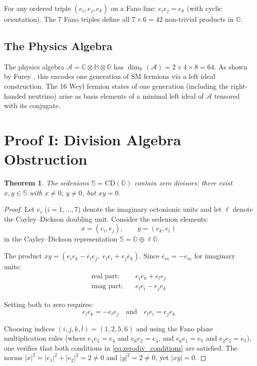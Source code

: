 \documentclass[12pt,a4paper]{article}
\newtheorem{theorem}{Theorem}
\theoremstyle{definition}
\theoremstyle{remark}
\newcommand{\Oct}{\mathbb{O}}
\newcommand{\Quat}{\mathbb{H}}
\newcommand{\Comp}{\mathbb{C}}
\newcommand{\Real}{\mathbb{R}}
\newcommand{\Sed}{\mathbb{S}}
\newcommand{\Alg}{\mathcal{A}}
\begin{document}
For any ordered triple $(e_i, e_j, e_k)$ on a Fano line: $e_i e_j = e_k$ 
(with cyclic orientation). The 7 Fano triples define all 
$7 \times 6 = 42$ non-trivial products in $\Oct$.

\subsection{The Physics Algebra}

The physics algebra $\Alg = \Comp \otimes \Quat \otimes \Oct$ has 
$\dim_\Real(\Alg) = 2 \times 4 \times 8 = 64$. As shown by Furey 
\cite{Furey2016}, this encodes one generation of SM fermions via a 
left ideal construction. The 16 Weyl fermion states of one generation 
(including the right-handed neutrino) arise as basis elements of a 
minimal left ideal of $\Alg$ tensored with its conjugate.

\section{Proof I: Division Algebra Obstruction}
\label{sec:hurwitz}

\begin{theorem}
\label{thm:zerodiv}
The sedenions $\Sed = \mathrm{CD}(\Oct)$ contain zero divisors: there exist 
$x, y \in \Sed$ with $x \neq 0$, $y \neq 0$, but $xy = 0$.
\end{theorem}

\begin{proof}
Let $e_i$ ($i = 1, \ldots, 7$) denote the imaginary octonionic units and let 
$\ell$ denote the Cayley--Dickson doubling unit. Consider the sedenion elements:
\begin{equation}
x = (e_i, e_j), \qquad y = (e_k, e_l)
\end{equation}
in the Cayley--Dickson representation $\Sed = \Oct \oplus \ell\Oct$.

The product $xy = (e_i e_k - \bar{e}_l e_j, \; e_l e_i + e_j \bar{e}_k)$.
Since $\bar{e}_m = -e_m$ for imaginary units:
\begin{align}
\text{real part:} &\quad e_i e_k + e_l e_j \\
\text{imag part:} &\quad e_l e_i - e_j e_k
\end{align}

Setting both to zero requires:
\begin{equation}
e_i e_k = -e_l e_j \quad \text{and} \quad e_l e_i = e_j e_k
\label{eq:zerodiv_conditions}
\end{equation}

Choosing indices $(i,j,k,l) = (1,2,5,6)$ and using the Fano plane multiplication 
rules (where $e_1 e_5 = e_4$ and $e_6 e_2 = e_4$, and $e_6 e_1 = e_7$ and 
$e_2 e_5 = e_7$), one verifies that both conditions in 
\eqref{eq:zerodiv_conditions} are satisfied. The norms $|x|^2 = |e_1|^2 + |e_2|^2 = 2 \neq 0$ 
and $|y|^2 = 2 \neq 0$, yet $|xy| = 0$.
\end{proof}
\end{document}
